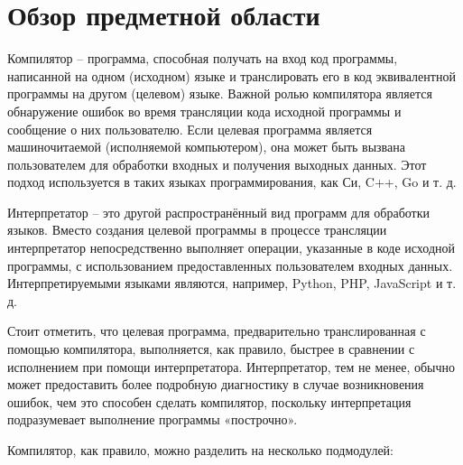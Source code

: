 \newpage
\section{Обзор предметной области}
\label{sec:subject_overview}

Компилятор -- программа, способная получать на вход код программы, написанной на одном (исходном) языке и транслировать его в код эквивалентной программы на другом (целевом) языке.
Важной ролью компилятора является обнаружение ошибок во время трансляции кода исходной программы и сообщение о них пользователю.
Если целевая программа является машиночитаемой (исполняемой компьютером), она может быть вызвана пользователем для обработки входных и получения выходных данных.
Этот подход используется в таких языках программирования, как Си, C++, Go и т. д.

Интерпретатор -- это другой распространённый вид программ для обработки языков.
Вместо создания целевой программы в процессе трансляции интерпретатор непосредственно выполняет операции, указанные в коде исходной программы, с использованием предоставленных пользователем входных данных.
Интерпретируемыми языками являются, например, Python, PHP, JavaScript и т. д.

Стоит отметить, что целевая программа, предварительно транслированная с помощью компилятора, выполняется, как правило, быстрее в сравнении с исполнением при помощи интерпретатора.
Интерпретатор, тем не менее, обычно может предоставить более подробную диагностику в случае возникновения ошибок, чем это способен сделать компилятор, поскольку интерпретация подразумевает выполнение программы «построчно».
\cite{dragon_book}

Компилятор, как правило, можно разделить на несколько подмодулей:

